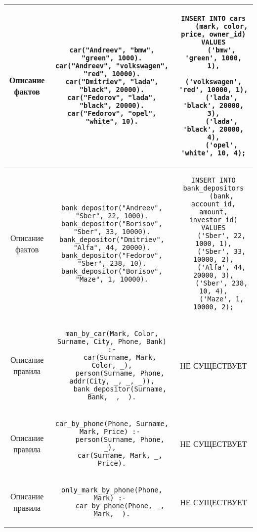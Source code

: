 \begin{landscape}
\begin{longtable}{|c|c|c|}
\hline

Описание фактов&
\begin{lstlisting}
car("Andreev", "bmw", "green", 1000).
car("Andreev", "volkswagen", "red", 10000).
car("Dmitriev", "lada", "black", 20000).
car("Fedorov", "lada", "black", 20000).
car("Fedorov", "opel", "white", 10).
\end{lstlisting}&
\begin{lstlisting}
INSERT INTO cars
    (mark, color, price, owner_id)
VALUES
    ('bmw', 'green', 1000, 1),
    ('volkswagen', 'red', 10000, 1),
    ('lada', 'black', 20000, 3),
    ('lada', 'black', 20000, 4),
    ('opel', 'white', 10, 4);
\end{lstlisting} \\

\hline

Описание фактов&
\begin{lstlisting}
bank_depositor("Andreev", "Sber", 22, 1000).
bank_depositor("Borisov", "Sber", 33, 10000).
bank_depositor("Dmitriev", "Alfa", 44, 20000).
bank_depositor("Fedorov", "Sber", 238, 10).
bank_depositor("Borisov", "Maze", 1, 10000).
\end{lstlisting}&
\begin{lstlisting}
INSERT INTO bank_depositors
    (bank, account_id, amount, investor_id)
VALUES
    ('Sber', 22, 1000, 1),
    ('Sber', 33, 10000, 2),
    ('Alfa', 44, 20000, 3),
    ('Sber', 238, 10, 4),
    ('Maze', 1, 10000, 2);
\end{lstlisting} \\

\hline

Описание правила&
\begin{lstlisting}
man_by_car(Mark, Color, Surname, City, Phone, Bank) :-
    car(Surname, Mark, Color, _),
    person(Surname, Phone, addr(City, _, _, _)),
    bank_depositor(Surname, Bank, _, _).
\end{lstlisting}&
НЕ СУЩЕСТВУЕТ\\

\hline

Описание правила&
\begin{lstlisting}
car_by_phone(Phone, Surname, Mark, Price) :- 
    person(Surname, Phone, _), 
    car(Surname, Mark, _, Price).
\end{lstlisting}&
НЕ СУЩЕСТВУЕТ\\

\hline

Описание правила&
\begin{lstlisting}
only_mark_by_phone(Phone, Mark) :- 
    car_by_phone(Phone, _, Mark, _).
\end{lstlisting}&
НЕ СУЩЕСТВУЕТ\\


\end{longtable}
\end{landscape}

